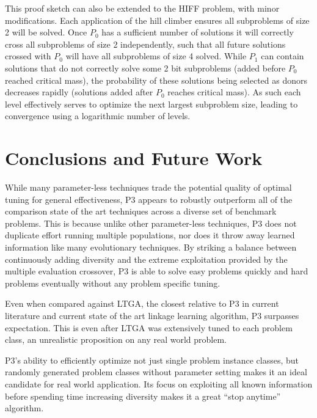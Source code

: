 \documentclass{sig-alternate}
\begin{document}
This proof sketch can also be extended to the HIFF problem, with minor modifications.
Each application of the hill climber ensures all subproblems of size 2 will be solved.
Once $P_0$ has a sufficient number of solutions it will correctly cross all subproblems of size 2
independently, such that all future solutions crossed with $P_0$ will have all subproblems
of size 4 solved.  While $P_1$ can contain solutions that do not correctly solve some 2 bit
subproblems (added before $P_0$ reached critical mass), the probability of these solutions
being selected as donors decreases rapidly (solutions added after $P_0$ reaches critical mass).
As such each level effectively serves to optimize the next largest subproblem size, leading to
convergence using a logarithmic number of levels.


\section{Conclusions and Future Work}
While many parameter-less techniques trade the potential quality of optimal tuning
for general effectiveness, P3 appears to robustly outperform all of the comparison
state of the art techniques across a diverse set of benchmark problems.  This is
because unlike other parameter-less techniques, P3 does not duplicate effort running
multiple populations, nor does it throw away learned information like many evolutionary
techniques.  By striking
a balance between continuously adding diversity and the extreme exploitation provided
by the multiple evaluation crossover, P3 is able to solve easy problems quickly
and hard problems eventually without any problem specific tuning.

Even when compared against LTGA, the closest relative to P3 in current literature
and current state of the art linkage learning algorithm, P3 surpasses expectation.
This is even after LTGA was extensively tuned to each problem class, an unrealistic
proposition on any real world problem.

P3's ability to efficiently optimize not just single problem instance classes,
but randomly generated problem classes without parameter setting makes it an
ideal candidate for real world application.  Its focus on exploiting all known
information before spending time increasing diversity makes it a great ``stop anytime''
algorithm.
\end{document}
